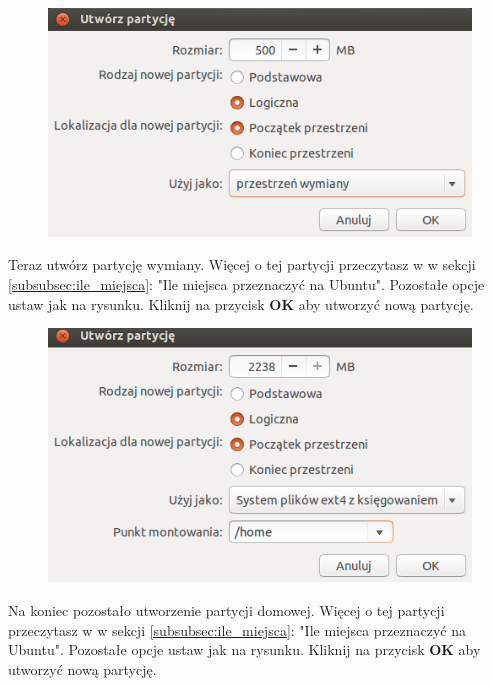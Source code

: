 \begin{figure}
		\includegraphics[scale=0.8]{images/instalator_partycjonowanie_gparted_dodaj_swap.png}
\end{figure}
Teraz utwórz partycję wymiany. Więcej o tej partycji przeczytasz w w sekcji \ref{subsubsec:ile_miejsca}: "Ile miejsca przeznaczyć na Ubuntu". Pozostałe opcje ustaw jak na rysunku. Kliknij na przycisk \textbf{OK} aby utworzyć nową partycję.

\begin{figure}
		\includegraphics[scale=0.8]{images/instalator_partycjonowanie_gparted_dodaj_home.png}
\end{figure}
Na koniec pozostało utworzenie partycji domowej. Więcej o tej partycji przeczytasz w w sekcji \ref{subsubsec:ile_miejsca}: "Ile miejsca przeznaczyć na Ubuntu". Pozostałe opcje ustaw jak na rysunku. Kliknij na przycisk \textbf{OK} aby utworzyć nową partycję.
\clearpage

